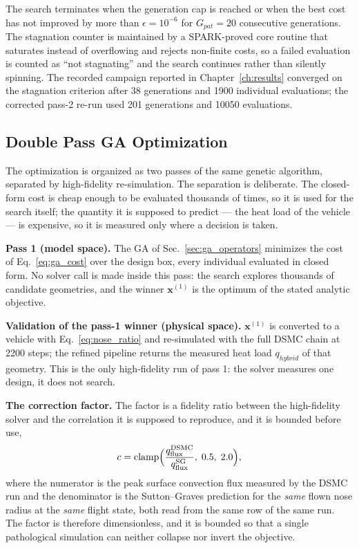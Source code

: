 The search terminates when the generation cap is reached or when the best cost has not improved by more than $\epsilon = 10^{-6}$ for $G_{pat} = 20$ consecutive generations. The stagnation counter is maintained by a SPARK-proved core routine that saturates instead of overflowing and rejects non-finite costs, so a failed evaluation is counted as ``not stagnating'' and the search continues rather than silently spinning. The recorded campaign reported in Chapter~\ref{ch:results} converged on the stagnation criterion after 38 generations and 1900 individual evaluations; the corrected pass-2 re-run used 201 generations and 10050 evaluations.

\subsection{Double Pass GA Optimization}
\label{sec:double_pass_ga}

The optimization is organized as two passes of the same genetic algorithm, separated by high-fidelity re-simulation. The separation is deliberate. The closed-form cost is cheap enough to be evaluated thousands of times, so it is used for the search itself; the quantity it is supposed to predict --- the heat load of the vehicle --- is expensive, so it is measured only where a decision is taken.

\textbf{Pass 1 (model space).} The GA of Sec.~\ref{sec:ga_operators} minimizes the cost of Eq.~\eqref{eq:ga_cost} over the design box, every individual evaluated in closed form. No solver call is made inside this pass: the search explores thousands of candidate geometries, and the winner $\mathbf{x}^{(1)}$ is the optimum of the stated analytic objective.

\textbf{Validation of the pass-1 winner (physical space).} $\mathbf{x}^{(1)}$ is converted to a vehicle with Eq.~\eqref{eq:nose_ratio} and re-simulated with the full DSMC chain at 2200 steps; the refined pipeline returns the measured heat load $q_{hybrid}$ of that geometry. This is the only high-fidelity run of pass 1: the solver measures one design, it does not search.

\textbf{The correction factor.} The factor is a fidelity ratio between the high-fidelity solver and the correlation it is supposed to reproduce, and it is bounded before use,
\begin{equation}
    c = \operatorname{clamp}\Bigl(\frac{q^{\mathrm{DSMC}}_{\mathrm{flux}}}{q^{\mathrm{SG}}_{\mathrm{flux}}},\;\allowbreak 0.5,\;\allowbreak 2.0\Bigr),
    \label{eq:correction_factor}
\end{equation}
where the numerator is the peak surface convection flux measured by the DSMC run and the denominator is the Sutton--Graves prediction for the \emph{same} flown nose radius at the \emph{same} flight state, both read from the same row of the same run. The factor is therefore dimensionless, and it is bounded so that a single pathological simulation can neither collapse nor invert the objective.

